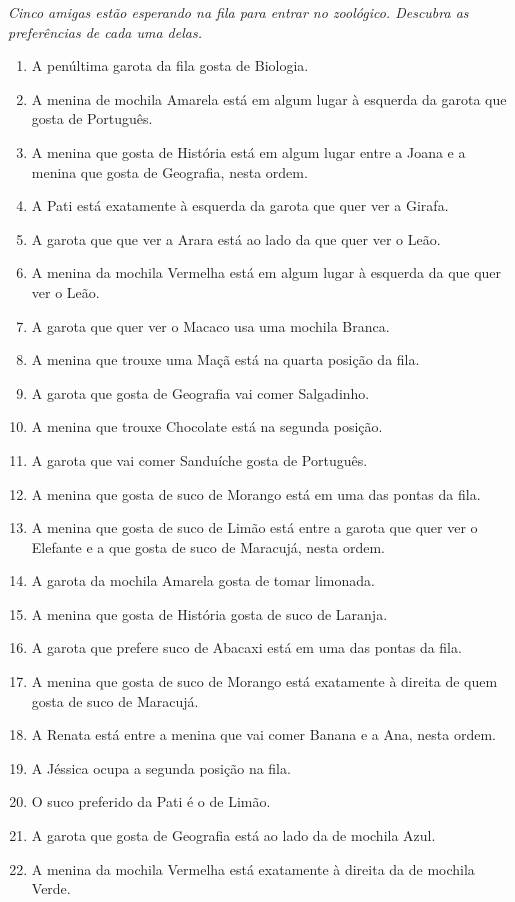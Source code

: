 \documentclass[a4paper,12pt]{article}
\begin{document}
{{\em 
Cinco amigas estão esperando na fila para entrar no zoológico. Descubra as preferências de cada uma delas.
\begin{enumerate}
\item   A penúltima garota da fila gosta de Biologia.
\item	A menina de mochila Amarela está em algum lugar à esquerda da garota que gosta de Português.
\item	A menina que gosta de História está em algum lugar entre a Joana e a menina que gosta de Geografia, nesta ordem.
\item	A Pati está exatamente à esquerda da garota que quer ver a Girafa.
\item	A garota que que ver a Arara está ao lado da que quer ver o Leão.
\item	A menina da mochila Vermelha está em algum lugar à esquerda da que quer ver o Leão.
\item	A garota que quer ver o Macaco usa uma mochila Branca.
\item	A menina que trouxe uma Maçã está na quarta posição da fila.
\item	A garota que gosta de Geografia vai comer Salgadinho.
\item	A menina que trouxe Chocolate está na segunda posição.
\item	A garota que vai comer Sanduíche gosta de Português.
\item	A menina que gosta de suco de Morango está em uma das pontas da fila.
\item	A menina que gosta de suco de Limão está entre a garota que quer ver o Elefante e a que gosta de suco de Maracujá, nesta ordem.
\item	A garota da mochila Amarela gosta de tomar limonada.
\item	A menina que gosta de História gosta de suco de Laranja.
\item	A garota que prefere suco de Abacaxi está em uma das pontas da fila.
\item	A menina que gosta de suco de Morango está exatamente à direita de quem gosta de suco de Maracujá.
\item	A Renata está entre a menina que vai comer Banana e a Ana, nesta ordem.
\item	A Jéssica ocupa a segunda posição na fila.
\item	O suco preferido da Pati é o de Limão.
\item	A garota que gosta de Geografia está ao lado da de mochila Azul.
\item	A menina da mochila Vermelha está exatamente à direita da de mochila Verde.
   

\end{enumerate}}}
\end{document}
